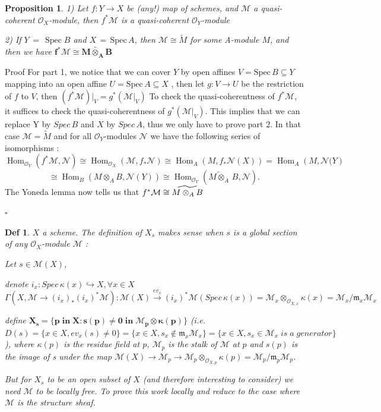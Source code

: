 \documentclass{article}
\newtheorem{definition}[theorem]{Def}
\newtheorem{proposition}[theorem]{Proposition}
\newenvironment{Proof}{{\noindent \indent \it Proof:\quad}}{\hfill $\square$\par}
\begin{document}
\begin{proposition} 
1) Let $f:Y\to X$ be (any!) map of schemes, and $\mathcal M$ a quasi-coherent ${\mathcal{O}}_{X}$-module, then $f^{\ast}\mathcal M$ is a quasi-coherent ${\mathcal{O}}_{Y}$-module

2) If $Y\,=\,\operatorname{Spec}B$ and $X\,=\,{\mathrm{Spec}}\,A$, then $\mathcal M\cong{\widetilde{{M}}}$ for some A-module $M$, and then we have $\bm{f^{\ast}\mathcal{M}\cong \widetilde{M\otimes_{A}B}}$ 
\end{proposition}
\begin{Proof}
    Proof For part 1,  we notice that we can cover $Y$ by open affines $V={\mathrm{Spec}}\,B\subseteq Y$ mapping into an open affine $U={\mathrm{Spec}}\,A\subseteq X$ , then let $g:V\to U$ be the restriction of $f$ to $V$, then $(f^{\ast}\mathcal{M})|_{V}=g^{*}(\mathcal{M}|_{V})$ To check the quasi-coherentness of $f^{\ast}{\mathcal{M}}$, it suffices to check the quasi-coherentness of $g^{\ast}({\mathcal{M}}|_{V})$. This implies that we can replace Y by $Spec\,B$ and $X$ by $Spec\,A$,  thus we only have to prove part 2. 
In that case $\mathcal M=\widetilde M$ and for all ${\mathcal{O}}_{Y}$-modules $\mathcal N$ we have the following series of isomorphisms :
$$
\operatorname{Hom}_{\mathcal O_Y}(f^\ast \mathcal M,{\mathcal{N}})
\cong
\operatorname{Hom}_{\mathcal O_X}(\mathcal M,f_\ast{\mathcal{N}})
\cong
\operatorname{Hom}_{A}(M,f_\ast{\mathcal{N}(X)})
=
\operatorname{Hom}_{A}(M,{\mathcal{N}(Y})
$$
$$
\cong\operatorname{Hom}_{B}(M\otimes_{A}B,{\mathcal{N}}(Y))\cong\operatorname{Hom}_{\mathcal O_Y}({\widetilde{M\otimes_{A}}}\,B,{\mathcal{N}}). 
$$
The Yoneda lemma now tells us that $f^{\ast}{\cal M}\cong \widetilde{M\otimes_{A}B}$

\end{Proof}


\begin{definition}
$X$ a scheme. The definition of $X_s$ makes sense when $s$ is a global section of any $\mathcal O_X$-module $\mathcal M$ :



Let $s\in \mathcal M(X)$, 

denote $i_x:Spec\,\kappa(x)\hookrightarrow X,\forall x\in X$
$$
\Gamma(X, \mathcal M\to (i_x)_\ast(i_x)^\ast\mathcal M): \mathcal M(X)\xrightarrow{ev_x} (i_x)^\ast \mathcal M(Spec\,\kappa(x))
=\mathcal M_x \otimes_{\mathcal O_{X,x}} \kappa(x)
=\mathcal M_x/\mathfrak m_x \mathcal M_x
$$

define $\bm{X_s = \{ p\; in\; X : s(p) \ne 0\; in\; \mathcal M_p \otimes \kappa(p) \}}$ 
(i.e. $D(s)
=\{x\in X,ev_x(s)\ne 0\}
=\{x\in X,s_x\notin \mathfrak m_x\mathcal M_x\}
=\{x\in X,s_x\in \mathcal M_x\;is\;a\;generator\}$), where $\kappa(p)$ is the residue field at $p$, $\mathcal M_p$ is the stalk of $\mathcal M$ at $p$ and $s(p)$ is the image of s under the map $\mathcal M(X) \to \mathcal M_p \to \mathcal M_p \otimes_{\mathcal O_{X,p}} \kappa(p)=\mathcal M_p/\mathfrak m_p \mathcal M_p$.

But for $X_s$ to be an open subset of $X$ (and therefore interesting to consider) we need $\mathcal M$ to be locally free. To prove this work locally and reduce to the case where $\mathcal M$ is the structure sheaf.
\end{definition}
\end{document}
